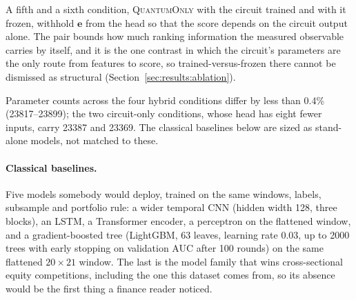 A fifth and a sixth condition, \textsc{QuantumOnly} with the circuit trained
and with it frozen, withhold $\mathbf{e}$ from the head so that the score
depends on the circuit output alone. The pair bounds how much ranking
information the measured observable carries by itself, and it is the one
contrast in which the circuit's parameters are the only route from features to
score, so trained-versus-frozen there cannot be dismissed as structural
(Section~\ref{sec:results:ablation}).

Parameter counts across the four hybrid conditions differ by less than
0.4\% (\numrange{23817}{23899}); the two circuit-only conditions, whose head
has eight fewer inputs, carry \num{23387} and \num{23369}. The classical
baselines below are sized as stand-alone models, not matched to these.

\paragraph{Classical baselines.}
Five models somebody would deploy, trained on the same windows, labels,
subsample and portfolio rule: a wider temporal CNN (hidden width \num{128},
three blocks), an LSTM, a Transformer encoder, a perceptron on the flattened
window, and a gradient-boosted tree (LightGBM, \num{63} leaves, learning rate
\num{0.03}, up to \num{2000} trees with early stopping on validation AUC after
\num{100} rounds) on the same flattened $20 \times 21$ window. The last is the
model family that wins cross-sectional equity competitions, including the one
this dataset comes from, so its absence would be the first thing a finance
reader noticed.
